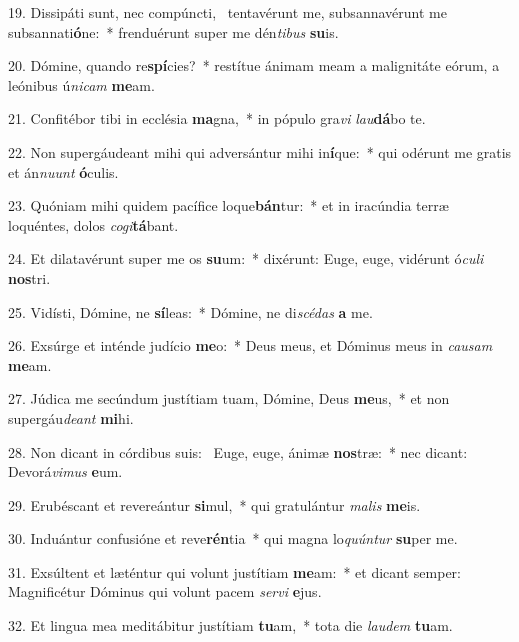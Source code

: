 19. Dissipáti sunt, nec compúncti, \dag\  tentavérunt me, subsannavérunt me subsannati\textbf{ó}ne:~*  frenduérunt super me dén\textit{ti}\textit{bus} \textbf{su}is.\

20. Dómine, quando re\textbf{spí}cies?~*  restítue ánimam meam a malignitáte eórum, a leónibus ú\textit{ni}\textit{cam} \textbf{me}am.\

21. Confitébor tibi in ecclésia \textbf{ma}gna,~*  in pópulo gra\textit{vi} \textit{lau}\textbf{dá}bo te.\

22. Non supergáudeant mihi qui adversántur mihi in\textbf{í}que:~*  qui odérunt me gratis et án\textit{nu}\textit{unt} \textbf{ó}culis.\

23. Quóniam mihi quidem pacífice loque\textbf{bán}tur:~*  et in iracúndia terræ loquéntes, dolos \textit{co}\textit{gi}\textbf{tá}bant.\

24. Et dilatavérunt super me os \textbf{su}um:~*  dixérunt: Euge, euge, vidérunt ó\textit{cu}\textit{li} \textbf{nos}tri.\

25. Vidísti, Dómine, ne \textbf{sí}leas:~*  Dómine, ne di\textit{scé}\textit{das} \textbf{a} me.\

26. Exsúrge et inténde judício \textbf{me}o:~*  Deus meus, et Dóminus meus in \textit{cau}\textit{sam} \textbf{me}am.\

27. Júdica me secúndum justítiam tuam, Dómine, Deus \textbf{me}us,~*  et non supergáu\textit{de}\textit{ant} \textbf{mi}hi.\

28. Non dicant in córdibus suis: \dag\  Euge, euge, ánimæ \textbf{nos}træ:~*  nec dicant: Devorá\textit{vi}\textit{mus} \textbf{e}um.\

29. Erubéscant et revereántur \textbf{si}mul,~*  qui gratulántur \textit{ma}\textit{lis} \textbf{me}is.\

30. Induántur confusióne et reve\textbf{rén}tia~*  qui magna lo\textit{quún}\textit{tur} \textbf{su}per me.\

31. Exsúltent et læténtur qui volunt justítiam \textbf{me}am:~*  et dicant semper: Magnificétur Dóminus qui volunt pacem \textit{ser}\textit{vi} \textbf{e}jus.\

32. Et lingua mea meditábitur justítiam \textbf{tu}am,~*  tota die \textit{lau}\textit{dem} \textbf{tu}am.\

